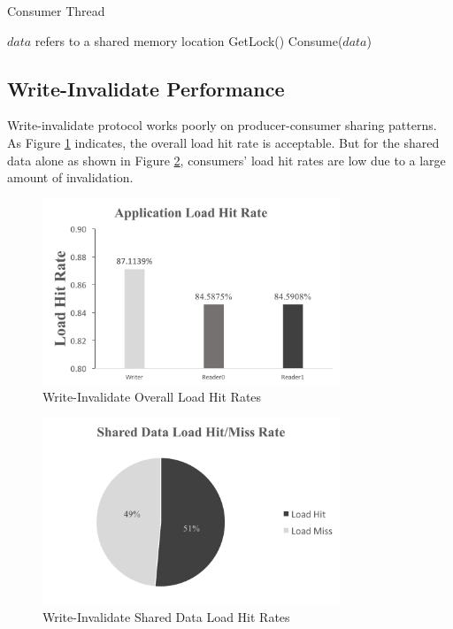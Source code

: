 \documentclass[conference]{IEEEtran}
\begin{document}
\begin{algorithm}
\caption{Consumer Thread}
\label{consumer_thread}
\begin{algorithmic}[1]
\State $data$ refers to a shared memory location
    \State GetLock() 
    \State Consume($data$)
\EndWhile
\end{algorithmic}
\end{algorithm}


\subsection{Write-Invalidate Performance}
Write-invalidate protocol works poorly on producer-consumer sharing patterns. As Figure \ref{write_invalidate} indicates, the overall load hit rate is acceptable. But for the shared data alone as shown in Figure \ref{write_invalidate_1}, consumers' load hit rates are low due to a large amount of invalidation.

\begin{figure}[!h]
\centering
\includegraphics[width=3.5in]{write_invalidate.png}
\caption{Write-Invalidate Overall Load Hit Rates}
\label{write_invalidate}
\end{figure}
\FloatBarrier

\begin{figure}[!h]
\centering
\includegraphics[width=3.5in]{write_invalidate_1.png}
\caption{Write-Invalidate Shared Data Load Hit Rates}
\label{write_invalidate_1}
\end{figure}
\FloatBarrier
\end{document}
